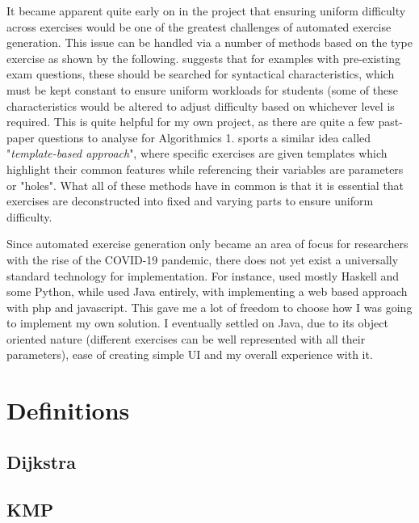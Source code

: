 \documentclass{l4proj}
\begin{document}
It became apparent quite early on in the project that ensuring uniform difficulty across exercises would be one of the greatest challenges of automated exercise generation. This issue can be handled via a number of methods based on the type exercise as shown by the following. \citet{Hoz21} suggests that for examples with pre-existing exam questions, these should be searched for syntactical characteristics, which must be kept constant to ensure uniform workloads for students (some of these characteristics would be altered to adjust difficulty based on whichever level is required. This is quite helpful for my own project, as there are quite a few past-paper questions to analyse for Algorithmics 1. \citet{Sad12} sports a similar idea called  "\emph{template-based approach}", where specific exercises are given templates which highlight their common features while referencing their variables are parameters or "holes". What all of these methods have in common is that it is essential that exercises are deconstructed into fixed and varying parts to ensure uniform difficulty.

Since automated exercise generation only became an area of focus for researchers with the rise of the COVID-19 pandemic, there does not yet exist a universally standard technology for implementation. For instance, \citet{Hoz21} used mostly Haskell and some Python, while \citet {Esh22} used Java entirely, with \citet{Kot19} implementing a web based approach with php and javascript. This gave me a lot of freedom to choose how I was going to implement my own solution. I eventually settled on Java, due to its object oriented nature (different exercises can be well represented with all their parameters), ease of creating simple UI and my overall experience with it.

\section{Definitions}
\subsection{Dijkstra}



\subsection{KMP}
\end{document}
